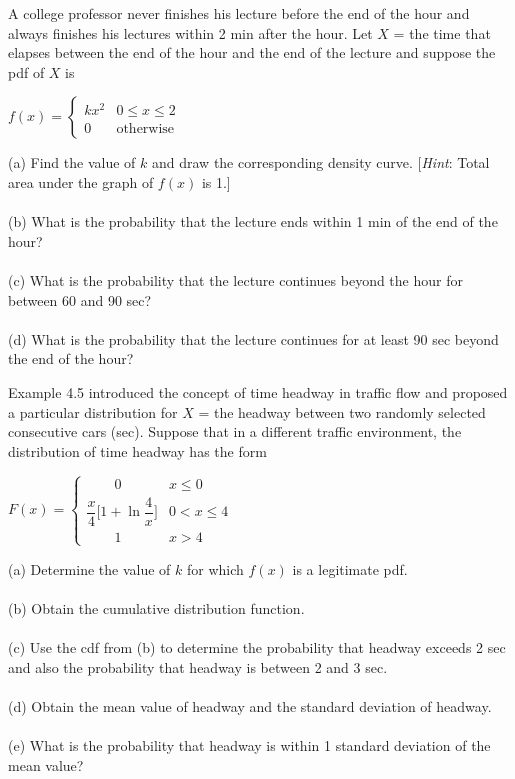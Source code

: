 \documentclass[12pt,letterpaper]{hmcpset}
\begin{document}
\begin{solution}

\end{solution}
\newpage
\begin{problem}[4.1.5]
A college professor never finishes his lecture before the end of
the hour and always finishes his lectures within 2 min after the
hour. Let $X$ = the time that elapses between the end of the
hour and the end of the lecture and suppose the pdf of $X$ is
\begin{center}
$f(x) = \begin{cases}
	kx^2 & 0 \leq x \leq 2 \\
	0 & \mbox{otherwise}
	\end{cases}$
\end{center}
(a) Find the value of $k$ and draw the corresponding density
curve. [\textit{Hint}: Total area under the graph of $f(x)$ is 1.]\\
\\(b) What is the probability that the lecture ends within 1 min
of the end of the hour?\\
\\(c) What is the probability that the lecture continues beyond
the hour for between 60 and 90 sec?\\
\\(d) What is the probability that the lecture continues for at
least 90 sec beyond the end of the hour?
\end{problem}

\begin{solution}

\end{solution}
\newpage

\begin{problem}[4.2.13]
Example 4.5 introduced the concept of time headway in
traffic flow and proposed a particular distribution for $X$ = 
the headway between two randomly selected consecutive
cars (sec). Suppose that in a different traffic environment,
the distribution of time headway has the form
\begin{center}
$F(x) = \begin{cases}
	\qquad 0 & x \leq 0 \\
	\dfrac{x}{4}\Big[1 + \ln{\dfrac{4}{x}}\Big] & 0 < x \leq 4\\
	\qquad1 & x >4
	\end{cases}$
\end{center}
(a) Determine the value of $k$ for which $f(x)$ is a legitimate pdf.\\
\\(b) Obtain the cumulative distribution function.\\
\\(c) Use the cdf from (b) to determine the probability that
headway exceeds 2 sec and also the probability that
headway is between 2 and 3 sec.\\
\\(d) Obtain the mean value of headway and the standard
deviation of headway.\\
\\(e) What is the probability that headway is within 1 standard
deviation of the mean value?
\end{problem}
\end{document}
